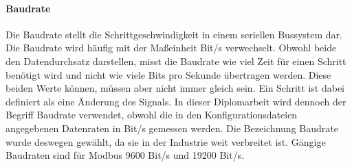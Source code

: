 \paragraph{Baudrate} \label{baud_rate}
Die Baudrate stellt die Schrittgeschwindigkeit in einem seriellen Bussystem dar. Die Baudrate wird häufig mit der Maßeinheit Bit/s verwechselt. Obwohl beide den Datendurchsatz darstellen, misst die Baudrate wie viel Zeit für einen Schritt benötigt wird und nicht wie viele Bits pro Sekunde übertragen werden. Diese beiden Werte können, müssen aber nicht immer gleich sein. Ein Schritt ist dabei definiert als eine Änderung des Signals. 
\cite{KUNBUS_GmbH_Baudrate:o.J.}
In dieser Diplomarbeit wird dennoch der Begriff Baudrate verwendet, obwohl die in den Konfigurationsdateien angegebenen Datenraten in Bit/s gemessen werden. Die Bezeichnung Baudrate wurde deswegen gewählt, da sie in der Industrie weit verbreitet ist. Gängige Baudraten sind für Modbus 9600 Bit/s und 19200 Bit/s.

